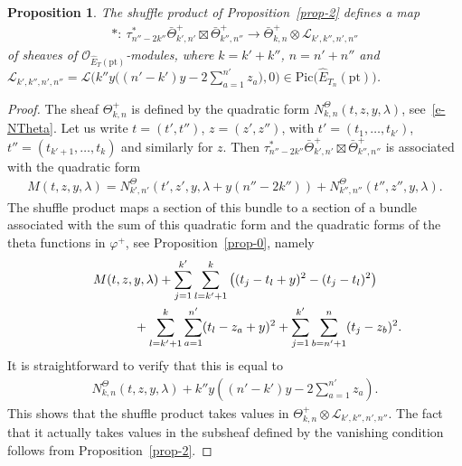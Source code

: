 \documentclass[10pt,a4paper]{amsart}
\numberwithin{equation}{section}
\newtheorem{Proposition}[Theorem]{Proposition}
 { \theoremstyle{definition}
\newtheorem{Definition}[Theorem]{Definition}
\newtheorem{Example}[Theorem]{Example}
\newtheorem{Remark}[Theorem]{Remark} }
\begin{document}
\begin{Proposition} The shuffle product of Proposition~{\rm \ref{prop-2}} defines a map
\begin{gather*}
*\colon \ \tau^*_{n''-2k''}\bar\Theta^+_{k',n'}\boxtimes\bar\Theta^+_{k'',n''}\to\bar\Theta^+_{k,n}\otimes \mathcal L_{k',k'',n',n''}
\end{gather*}
of sheaves of $\mathcal O_{\hat E_T(\mathrm{pt})}$-modules, where $k=k'+k''$, $n=n'+n''$ and $\mathcal L_{k',k'',n',n''}= \mathcal L\Big(k''y\Big((n'-k')y-2\sum\limits_{a=1}^{n'}z_a\Big),0\Big)\in\mathrm{Pic}\big(\hat E_{T_n}(\mathrm{pt})\big)$.
\end{Proposition}
\begin{proof} The sheaf $\Theta^+_{k,n}$ is defined by the quadratic form $N^\Theta_{k,n}(t,z,y,\lambda)$, see~\eqref{e-NTheta}. Let us write $t=(t',t'')$, $z=(z',z'')$, with $t'=(t_1,\dots,t_{k'})$, $t''=(t_{k'+1},\dots,t_k)$ and similarly for $z$. Then $\tau^*_{n''-2k''}\bar\Theta^+_{k',n'}\boxtimes\bar\Theta^+_{k'',n''}$ is associated with the quadratic form
 \begin{gather*}
 M(t,z,y,\lambda)=N^\Theta_{k',n'}(t',z',y,\lambda+y(n''-2k'')) +N^\Theta_{k'',n''}(t'',z'',y,\lambda).
 \end{gather*}
 The shuffle product maps a section of this bundle to a section of a bundle associated with the sum of this quadratic form and the quadratic forms of the theta functions in $\varphi^+$, see Proposition~\ref{prop-0}, namely
 \begin{gather*}
 M(t,z,y,\lambda) + \sum_{j=1}^{k'}\sum_{l=k'+1}^k \big((t_j-t_l+y)^2-(t_j-t_l)^2\big)\\
\hphantom{M(t,z,y,\lambda)}{} +\sum_{l=k'+1}^k \sum_{a=1}^{n'}(t_l-z_a+y)^2+\sum_{j=1}^{k'}\sum_{b=n'+1}^n (t_j-z_b)^2.
 \end{gather*}
 It is straightforward to verify that this is equal to
 \begin{gather*}
 N^\Theta_{k,n}(t,z,y,\lambda)+k''y\left((n'-k')y-2\sum_{a=1}^{n'}z_a\right).
 \end{gather*}
 This shows that the shuffle product takes values in $\Theta^+_{k,n}\otimes\mathcal L_{k',k'',n',n''}$. The fact that it actually takes values in the subsheaf defined by the vanishing condition follows from Proposition~\ref{prop-2}.
\end{proof}
\end{document}
